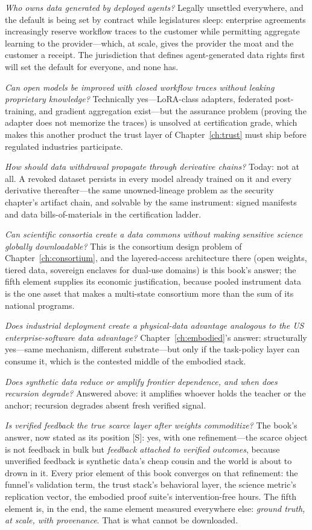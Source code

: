 \emph{Who owns data generated by deployed agents?} Legally unsettled everywhere, and the default is being set by contract while legislatures sleep: enterprise agreements increasingly reserve workflow traces to the customer while permitting aggregate learning to the provider---which, at scale, gives the provider the moat and the customer a receipt. The jurisdiction that defines agent-generated data rights first will set the default for everyone, and none has.

\emph{Can open models be improved with closed workflow traces without leaking proprietary knowledge?} Technically yes---LoRA-class adapters, federated post-training, and gradient aggregation exist---but the assurance problem (proving the adapter does not memorize the traces) is unsolved at certification grade, which makes this another product the trust layer of Chapter~\ref{ch:trust} must ship before regulated industries participate.

\emph{How should data withdrawal propagate through derivative chains?} Today: not at all. A revoked dataset persists in every model already trained on it and every derivative thereafter---the same unowned-lineage problem as the security chapter's artifact chain, and solvable by the same instrument: signed manifests and data bills-of-materials in the certification ladder.

\emph{Can scientific consortia create a data commons without making sensitive science globally downloadable?} This is the consortium design problem of Chapter~\ref{ch:consortium}, and the layered-access architecture there (open weights, tiered data, sovereign enclaves for dual-use domains) is this book's answer; the fifth element supplies its economic justification, because pooled instrument data is the one asset that makes a multi-state consortium more than the sum of its national programs.

\emph{Does industrial deployment create a physical-data advantage analogous to the US enterprise-software data advantage?} Chapter~\ref{ch:embodied}'s answer: structurally yes---same mechanism, different substrate---but only if the task-policy layer can consume it, which is the contested middle of the embodied stack.

\emph{Does synthetic data reduce or amplify frontier dependence, and when does recursion degrade?} Answered above: it amplifies whoever holds the teacher or the anchor; recursion degrades absent fresh verified signal.

\emph{Is verified feedback the true scarce layer after weights commoditize?} The book's answer, now stated as its position [S]: yes, with one refinement---the scarce object is not feedback in bulk but \emph{feedback attached to verified outcomes}, because unverified feedback is synthetic data's cheap cousin and the world is about to drown in it. Every prior element of this book converges on that refinement: the funnel's validation term, the trust stack's behavioral layer, the science metric's replication vector, the embodied proof suite's intervention-free hours. The fifth element is, in the end, the same element measured everywhere else: \emph{ground truth, at scale, with provenance}. That is what cannot be downloaded.

